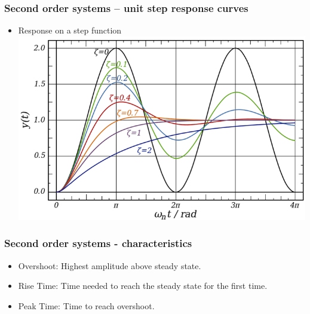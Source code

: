 \begin{frame}
\frametitle{Second order systems – unit step response curves}
\begin{itemize}
\item Response on a step function
\\ \vspace{1cm} \includegraphics[width=0.8\linewidth]{Afbeelding6}
\end{itemize}
\end{frame}

\begin{frame}
\frametitle{Second order systems - characteristics}
\begin{itemize}
\item Overshoot: Highest amplitude above steady state.
\item Rise Time: Time needed to reach the steady state for the first time.
\item Peak Time: Time to reach overshoot.
\\ \begin{figure}
\end{figure}
\end{itemize}
\end{frame}

